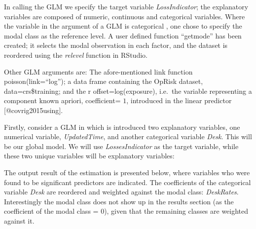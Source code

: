 \documentclass[]{article}
\newenvironment{Shaded}{\begin{snugshade}}{\end{snugshade}}
\newcommand{\DataTypeTok}[1]{\textcolor[rgb]{0.13,0.29,0.53}{#1}}
\newcommand{\KeywordTok}[1]{\textcolor[rgb]{0.13,0.29,0.53}{\textbf{#1}}}
\newcommand{\NormalTok}[1]{#1}
\newcommand{\OperatorTok}[1]{\textcolor[rgb]{0.81,0.36,0.00}{\textbf{#1}}}
\newcommand{\StringTok}[1]{\textcolor[rgb]{0.31,0.60,0.02}{#1}}
\begin{document}
\singlespacing

\doublespacing

In calling the GLM we specify the target variable \emph{LossIndicator};
the explanatory variables are composed of numeric, continuous and
categorical variables. Where the variable in the argument of a GLM is
categorical , one chose to specify the modal class as the reference
level. A user defined function ``getmode'' has been created; it selects
the modal observation in each factor, and the dataset is reordered using
the \emph{relevel} function in RStudio.

\singlespacing

\doublespacing

Other GLM arguments are: The afore-mentioned link function
poisson(link=``log''); a data frame containing the OpRisk dataset,
data=crs\$training; and the r offset=log(exposure), i.e.~the variable
representing a component known apriori, coefficient= \(1\), introduced
in the linear predictor {[}@covrig2015using{]}.\medskip

Firstly, consider a GLM in which is introduced two explanatory
variables, one numerical variable, \emph{UpdatedTime}, and another
categorical variable \emph{Desk}. This will be our global model. We will
use \emph{LossesIndicator} as the target variable, while these two
unique variables will be explanatory variables:

\singlespacing

\begin{Shaded}
\end{Shaded}

\doublespacing

The output result of the estimation is presented below, where variables
who were found to be significant predictors are indicated. The
coefficients of the categorical variable \emph{Desk} are reordered and
weighted against the modal class: \emph{DeskRates}. Interestingly the
modal class does not show up in the results section (as the coefficient
of the modal class = \(0\)), given that the remaining classes are
weighted against it.
\end{document}

